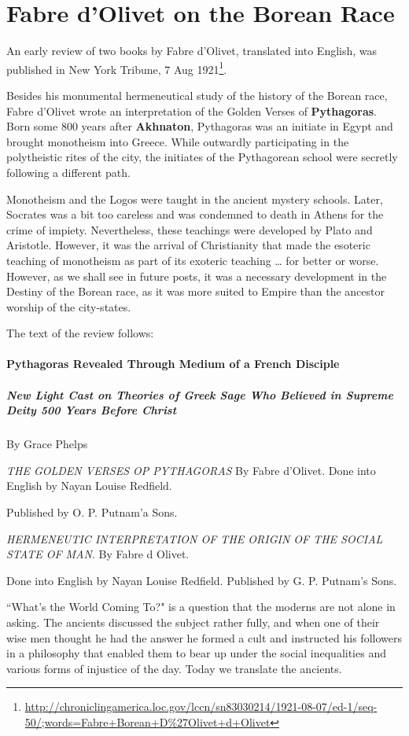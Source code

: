 \section{Fabre d'Olivet on the Borean Race}

An early review of two books by Fabre d'Olivet, translated into English, was published in New York Tribune, 7 Aug 1921\footnote{\url{http://chroniclingamerica.loc.gov/lccn/sn83030214/1921-08-07/ed-1/seq-50/;words=Fabre+Borean+D\%27Olivet+d+Olivet}}.

Besides his monumental hermeneutical study of the history of the Borean race, Fabre d'Olivet wrote an interpretation of the Golden Verses of \textbf{Pythagoras}. Born some 800 years after \textbf{Akhnaton}, Pythagoras was an initiate in Egypt and brought monotheism into Greece. While outwardly participating in the polytheistic rites of the city, the initiates of the Pythagorean school were secretly following a different path.

Monotheism and the Logos were taught in the ancient mystery schools. Later, Socrates was a bit too careless and was condemned to death in Athens for the crime of impiety. Nevertheless, these teachings were developed by Plato and Aristotle. However, it was the arrival of Christianity that made the esoteric teaching of monotheism as part of its exoteric teaching … for better or worse. However, as we shall see in future posts, it was a necessary development in the Destiny of the Borean race, as it was more suited to Empire than the ancestor worship of the city-states.

The text of the review follows:

\paragraph{Pythagoras Revealed Through Medium of a French Disciple}
\subparagraph{New Light Cast on Theories of Greek Sage Who Believed in Supreme Deity 500 Years Before Christ}
By Grace Phelps

\emph{THE GOLDEN VERSES OP PYTHAGORAS} By Fabre d'Olivet. Done into English by Nayan Louise Redfield.

Published by O. P. Putnam'a Sons.

\emph{HERMENEUTIC INTERPRETATION OF THE ORIGIN OF THE SOCIAL STATE OF MAN}. By Fabre d Olivet.

Done into English by Nayan Louise Redfield. Published by G. P. Putnam's Sons.

``What's the World Coming To?" is a question that the moderns are not alone in asking. The ancients discussed the subject rather fully, and when one of their wise men thought he had the answer he formed a cult and instructed his followers in a philosophy that enabled them to bear up under the social inequalities and various forms of injustice of the day. Today we translate the ancients.

